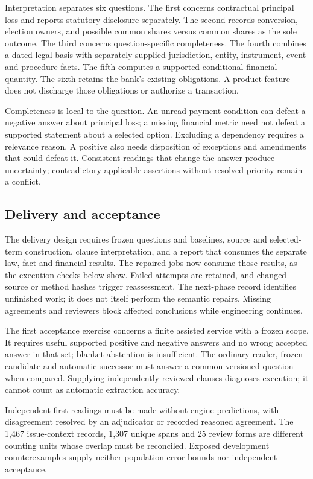 Interpretation separates six questions. The first concerns contractual principal
loss and reports statutory disclosure separately. The second records conversion,
election owners, and possible common shares versus common shares as the sole
outcome. The third concerns question-specific completeness. The fourth combines
a dated legal basis with separately supplied jurisdiction, entity, instrument,
event and procedure facts. The fifth computes a supported conditional financial
quantity. The sixth retains the bank's existing obligations. A product feature
does not discharge those obligations or authorize a transaction.

Completeness is local to the question. An unread payment condition can defeat
a negative answer about principal loss; a missing financial metric need not
defeat a supported statement about a selected option. Excluding a dependency
requires a relevance reason. A positive also needs disposition of exceptions
and amendments that could defeat it. Consistent readings that change the answer
produce uncertainty; contradictory applicable assertions without resolved
priority remain a conflict.

\subsection{Delivery and acceptance}

The delivery design requires frozen questions and baselines, source and
selected-term construction, clause interpretation, and a report that consumes
the separate law, fact and financial results. The repaired jobs now
consume those results, as the execution checks below show. Failed attempts
are retained, and changed source or method hashes trigger reassessment.
The next-phase record identifies unfinished work; it does not itself perform
the semantic repairs. Missing agreements and reviewers block affected
conclusions while engineering continues.

The first acceptance exercise concerns a finite assisted service with a frozen
scope. It requires useful supported positive and negative answers and no wrong
accepted answer in that set; blanket abstention is insufficient. The ordinary
reader, frozen candidate and automatic successor must answer a common versioned
question when compared. Supplying independently reviewed clauses diagnoses
execution; it cannot count as automatic extraction accuracy.

Independent first readings must be made without engine predictions, with
disagreement resolved by an adjudicator or recorded reasoned agreement.
The 1,467 issue-context records, 1,307 unique spans and 25 review forms are
different counting units whose overlap must be reconciled. Exposed development
counterexamples supply neither population error bounds nor independent
acceptance.




